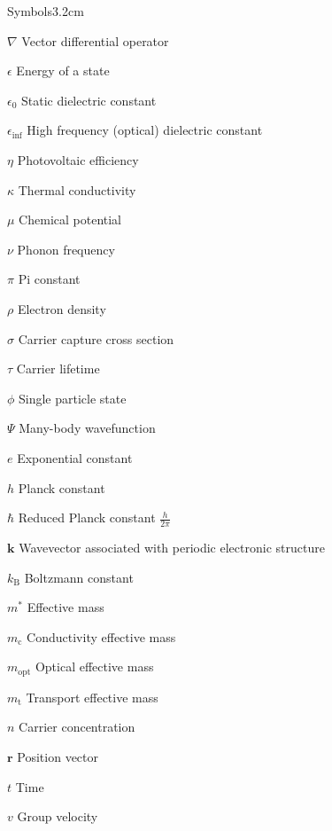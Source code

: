 \begin{mclistof}{Symbols}{3.2cm}

\item[$\nabla$] Vector differential operator
\item[$\epsilon$] Energy of a state
\item[$\epsilon_0$] Static dielectric constant
\item[$\epsilon_{\inf}$] High frequency (optical) dielectric constant 
\item[$\eta$] Photovoltaic efficiency
\item[$\kappa$] Thermal conductivity
\item[$\mu$] Chemical potential
\item[$\nu$] Phonon frequency
\item[$\pi$] Pi constant 
\item[$\rho$] Electron density
\item[$\sigma$] Carrier capture cross section
\item[$\tau$] Carrier lifetime
\item[$\phi$] Single particle state

\vspace{\frontmatterbaselineskip}

\item[$\Psi$] Many-body wavefunction

\vspace{\frontmatterbaselineskip}

\item[$e$] Exponential constant
\item[$h$] Planck constant 
\item[$\hbar$] Reduced Planck constant $\frac{h}{2\pi}$ 
\item[$\textbf{k}$] Wavevector associated with periodic electronic structure
\item[$k_\mathrm{B}$] Boltzmann constant 
\item[$m^*$] Effective mass
\item[$m_\mathrm{c}$] Conductivity effective mass
\item[$m_\mathrm{opt}$] Optical effective mass
\item[$m_\mathrm{t}$] Transport effective mass
\item[$n$] Carrier concentration
\item[$\textbf{r}$] Position vector
\item[$t$] Time
\item[$v$] Group velocity


\end{mclistof}

